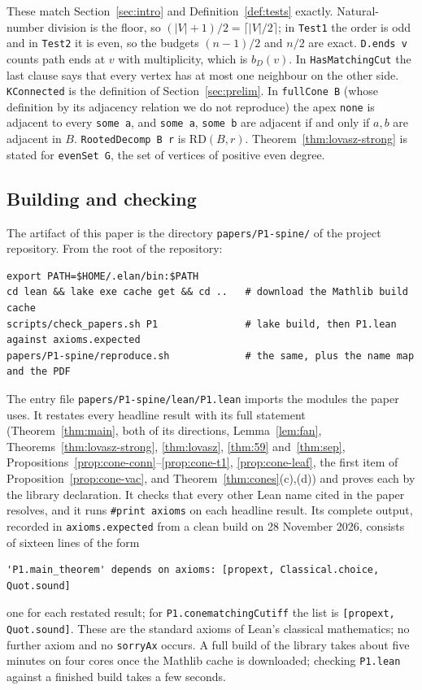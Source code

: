 \documentclass[11pt]{amsart}
\theoremstyle{definition}
\theoremstyle{remark}
\renewcommand{\_}{\oldunderscore\allowbreak}
\begin{document}
These match Section~\ref{sec:intro} and Definition~\ref{def:tests} exactly. Natural-number division
is the floor, so $(|V|+1)/2=\lceil|V|/2\rceil$; in \texttt{Test1} the order is odd and in
\texttt{Test2} it is even, so the budgets $(n-1)/2$ and $n/2$ are exact. \texttt{D.ends v} counts
path ends at $v$ with multiplicity, which is $b_D(v)$. In \texttt{HasMatchingCut} the last clause says
that every vertex has at most one neighbour on the other side. \texttt{KConnected} is the
definition of Section~\ref{sec:prelim}. In \texttt{fullCone B} (whose definition by its adjacency
relation we do not reproduce) the apex \texttt{none} is adjacent to every \texttt{some a}, and
\texttt{some a}, \texttt{some b} are adjacent if and only if $a,b$ are adjacent in $B$.
\texttt{RootedDecomp B r} is $\mathrm{RD}(B,r)$. Theorem~\ref{thm:lovasz-strong} is stated for
\texttt{evenSet G}, the set of vertices of positive even degree.

\subsection{Building and checking}
The artifact of this paper is the directory \texttt{papers/P1-spine/} of the project repository. From
the root of the repository:
{\footnotesize
\begin{verbatim}
export PATH=$HOME/.elan/bin:$PATH
cd lean && lake exe cache get && cd ..   # download the Mathlib build cache
scripts/check_papers.sh P1               # lake build, then P1.lean against axioms.expected
papers/P1-spine/reproduce.sh             # the same, plus the name map and the PDF
\end{verbatim}
}
The entry file \texttt{papers/P1-spine/lean/P1.lean} imports the modules the paper uses. It restates
every headline result with its full statement (Theorem~\ref{thm:main}, both of its directions,
Lemma~\ref{lem:fan}, Theorems~\ref{thm:lovasz-strong}, \ref{thm:lovasz}, \ref{thm:59}
and~\ref{thm:sep}, Propositions~\ref{prop:cone-conn}--\ref{prop:cone-t1}, \ref{prop:cone-leaf}, the
first item of Proposition~\ref{prop:cone-vac}, and Theorem~\ref{thm:cones}(c),(d)) and proves each
by the library declaration. It checks that every other Lean name cited in the paper resolves, and it
runs \texttt{\#print axioms} on each headline result. Its complete output, recorded in
\texttt{axioms.expected} from a clean build on 28 November 2026, consists of sixteen lines of the form
{\footnotesize
\begin{verbatim}
'P1.main_theorem' depends on axioms: [propext, Classical.choice, Quot.sound]
\end{verbatim}
}
one for each restated result; for \texttt{P1.cone\_matchingCut\_iff} the list is \texttt{[propext,
Quot.sound]}. These are the standard axioms of Lean's classical mathematics; no further axiom and no
\texttt{sorryAx} occurs. A full build of the library takes about five minutes on four cores once the
Mathlib cache is downloaded; checking \texttt{P1.lean} against a finished build takes a few seconds.
\end{document}
